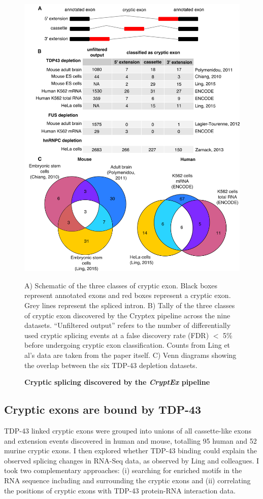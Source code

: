 \begin{figure}[h!]
	\centering
  	\includegraphics[width=\textwidth]{Figures/03_cryptic_exons/Figure_1_venn_inkscape.png}
	\caption{\textbf{Cryptic splicing discovered by the \emph{CryptEx} pipeline}}
		A) Schematic of the three classes of cryptic exon. Black boxes represent annotated exons and red boxes represent a cryptic exon. Grey lines represent the spliced intron. B) Tally of the three classes of cryptic exon discovered by the Cryptex pipeline across the nine datasets. ``Unfiltered output'' refers to the number of differentially used cryptic splicing events at a false discovery rate (FDR) $<$ 5\% before undergoing cryptic exon classification. Counts from Ling et al's data are taken from the paper itself. C) Venn diagrams showing the overlap between the six TDP-43 depletion datasets.
	\label{fig:cryptic_venn}
\end{figure}


\subsection{Cryptic exons are bound by TDP-43}
TDP-43 linked cryptic exons were grouped into unions of all cassette-like exons and extension events discovered in human and mouse, totalling 95 human and 52 murine cryptic exons. I then explored whether TDP-43 binding could explain the observed splicing changes in RNA-Seq data, as observed by Ling and colleagues. I took two complementary approaches: (i) searching for enriched motifs in the RNA sequence including and surrounding the cryptic exons and (ii) correlating the positions of cryptic exons with TDP-43 protein-RNA interaction data.

